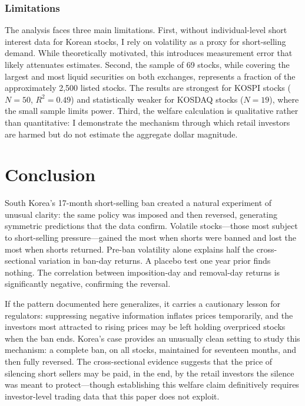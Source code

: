 \documentclass[12pt]{article}
\begin{document}
\subsubsection*{Limitations} The analysis faces three main limitations. First, without individual-level short interest data for Korean stocks, I rely on volatility as a proxy for short-selling demand. While theoretically motivated, this introduces measurement error that likely attenuates estimates. Second, the sample of 69 stocks, while covering the largest and most liquid securities on both exchanges, represents a fraction of the approximately 2,500 listed stocks. The results are strongest for KOSPI stocks ($N = 50$, $R^2 = 0.49$) and statistically weaker for KOSDAQ stocks ($N = 19$), where the small sample limits power. Third, the welfare calculation is qualitative rather than quantitative: I demonstrate the mechanism through which retail investors are harmed but do not estimate the aggregate dollar magnitude.


\section{Conclusion}

South Korea's 17-month short-selling ban created a natural experiment of unusual clarity: the same policy was imposed and then reversed, generating symmetric predictions that the data confirm. Volatile stocks---those most subject to short-selling pressure---gained the most when shorts were banned and lost the most when shorts returned. Pre-ban volatility alone explains half the cross-sectional variation in ban-day returns. A placebo test one year prior finds nothing. The correlation between imposition-day and removal-day returns is significantly negative, confirming the reversal.

If the pattern documented here generalizes, it carries a cautionary lesson for regulators: suppressing negative information inflates prices temporarily, and the investors most attracted to rising prices may be left holding overpriced stocks when the ban ends. Korea's case provides an unusually clean setting to study this mechanism: a complete ban, on all stocks, maintained for seventeen months, and then fully reversed. The cross-sectional evidence suggests that the price of silencing short sellers may be paid, in the end, by the retail investors the silence was meant to protect---though establishing this welfare claim definitively requires investor-level trading data that this paper does not exploit.
\end{document}

